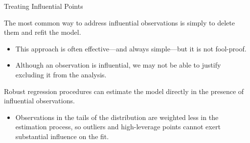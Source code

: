 \documentclass[10pt]{beamer}\usepackage[]{graphicx}\usepackage[]{color}
\makeatletter
\newcommand{\hlnum}[1]{\textcolor[rgb]{0.69,0.494,0}{#1}}%
\newcommand{\hlstr}[1]{\textcolor[rgb]{0.749,0.012,0.012}{#1}}%
\newcommand{\hlopt}[1]{\textcolor[rgb]{0,0,0}{#1}}%
\newcommand{\hlstd}[1]{\textcolor[rgb]{0,0,0}{#1}}%
\newcommand{\hlkwd}[1]{\textcolor[rgb]{0.004,0.004,0.506}{#1}}%
\newenvironment{kframe}{%
 \def\at@end@of@kframe{}%
 \ifinner\ifhmode%
  \def\at@end@of@kframe{\end{minipage}}%
  \begin{minipage}{\columnwidth}%
 \fi\fi%
 \def\FrameCommand##1{\hskip\@totalleftmargin \hskip-\fboxsep
 \colorbox{shadecolor}{##1}\hskip-\fboxsep
     \hskip-\linewidth \hskip-\@totalleftmargin \hskip\columnwidth}%
 \MakeFramed {\advance\hsize-\width
   \@totalleftmargin\z@ \linewidth\hsize
   \@setminipage}}%
 {\par\unskip\endMakeFramed%
 \at@end@of@kframe}
\newenvironment{knitrout}{}{} %
\makeatother
\begin{document}

\watermarkon %

\begin{frame}{Treating Influential Points}

  The most common way to address influential observations is simply to delete
  them and refit the model.
  \vc
  \begin{itemize}
  \item This approach is often effective---and always simple---but it is not
    fool-proof.
  \vc
  \item Although an observation is influential, we may not be able to justify
    excluding it from the analysis.
  \end{itemize}
  \vb
  Robust regression procedures can estimate the model directly in the
  presence of influential observations.
  \vc
  \begin{itemize}
  \item Observations in the tails of the distribution are weighted less in the
    estimation process, so outliers and high-leverage points cannot exert
    substantial influence on the fit.
  \end{itemize}

\end{frame}

\end{document}
